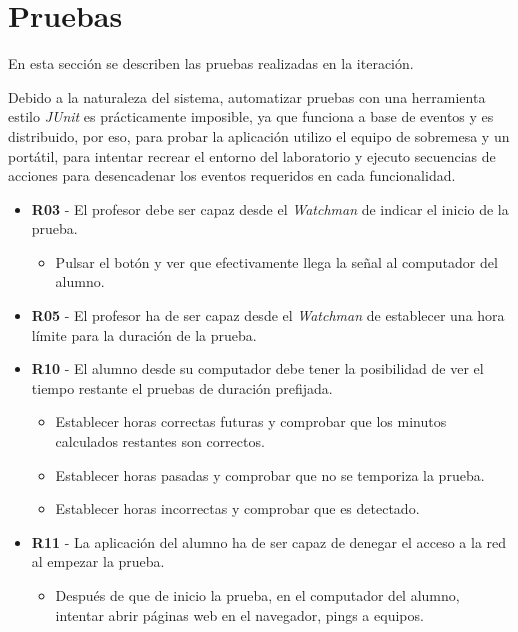 \section{Pruebas}

En esta sección se describen las pruebas realizadas en la iteración.
\newline

Debido a la naturaleza del sistema, automatizar pruebas con una herramienta estilo \emph{JUnit} es prácticamente imposible, ya que funciona a base de eventos y es distribuido, por eso, para probar la aplicación utilizo el equipo de sobremesa y un portátil, para intentar recrear el entorno del laboratorio y ejecuto secuencias de acciones para desencadenar los eventos requeridos en cada funcionalidad.

\begin{itemize}

	\item {\bfseries R03} - El profesor debe ser capaz desde el \emph{Watchman} de indicar el inicio de la prueba.

    \begin{itemize}

        \item Pulsar el botón y ver que efectivamente llega la señal al computador del alumno.

    \end{itemize}

    \item {\bfseries R05} - El profesor ha de ser capaz desde el \emph{Watchman} de establecer una hora límite para la duración de la prueba.

    \item {\bfseries R10} - El alumno desde su computador debe tener la posibilidad de ver el tiempo restante el pruebas de duración prefijada.

    \begin{itemize}
        \item Establecer horas correctas futuras y comprobar que los minutos calculados restantes son correctos.

        \item Establecer horas pasadas y comprobar que no se temporiza la prueba.

        \item Establecer horas incorrectas y comprobar que es detectado.
    \end{itemize}


    \item {\bfseries R11} - La aplicación del alumno ha de ser capaz de denegar el acceso a la red al empezar la prueba.

    \begin{itemize}

        \item Después de que de inicio la prueba, en el computador del alumno, intentar abrir páginas web en el navegador, pings a equipos.
    \end{itemize}

\end{itemize} 